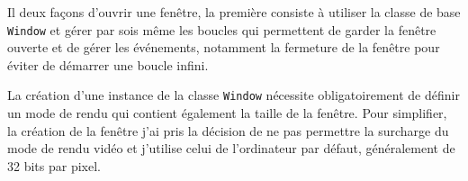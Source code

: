 \documentclass[11pt,a4paper,krantz2,11pt,oneside]{krantz}
\newenvironment{Shaded}{\begin{snugshade}}{\end{snugshade}}
\newcommand{\CommentTok}[1]{\textcolor[rgb]{0.37,0.37,0.37}{\textit{#1}}}
\newcommand{\DecValTok}[1]{\textcolor[rgb]{0.06,0.06,0.06}{#1}}
\newcommand{\FunctionTok}[1]{\textcolor[rgb]{0,0,0}{#1}}
\newcommand{\KeywordTok}[1]{\textcolor[rgb]{0.27,0.27,0.27}{\textbf{#1}}}
\newcommand{\NormalTok}[1]{#1}
\newcommand{\OtherTok}[1]{\textcolor[rgb]{0.37,0.37,0.37}{#1}}
\newcommand{\StringTok}[1]{\textcolor[rgb]{0.5,0.5,0.5}{#1}}
\begin{document}
Il deux façons d'ouvrir une fenêtre, la première consiste à utiliser la classe de base \texttt{Window} et gérer par sois même les boucles qui permettent de garder la fenêtre ouverte et de gérer les événements, notamment la fermeture de la fenêtre pour éviter de démarrer une boucle infini.

\begin{Shaded}
\end{Shaded}

La création d'une instance de la classe \texttt{Window} nécessite obligatoirement de définir un mode de rendu qui contient également la taille de la fenêtre. Pour simplifier, la création de la fenêtre j'ai pris la décision de ne pas permettre la surcharge du mode de rendu vidéo et j'utilise celui de l'ordinateur par défaut, généralement de 32 bits par pixel.
\end{document}
